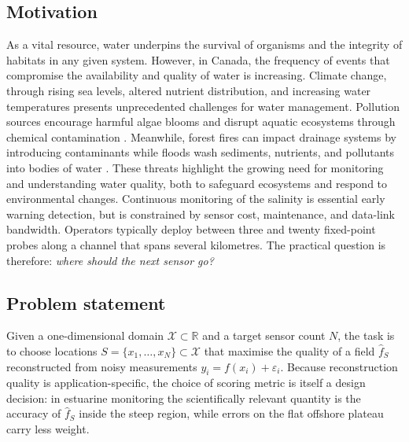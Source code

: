 \documentclass[11pt,letterpaper]{article}
\begin{document}
\subsection{Motivation}
As a vital resource, water underpins the survival of organisms and the integrity of habitats in any given system. However, in Canada, the frequency of events that compromise the availability and quality of water is increasing. Climate change, through rising sea levels, altered nutrient distribution, and increasing water temperatures presents unprecedented challenges for water management. Pollution sources encourage harmful algae blooms and disrupt aquatic ecosystems through chemical contamination \cite{ASRESU2025109194, oneil}. Meanwhile, forest fires can impact drainage systems by introducing contaminants while floods wash sediments, nutrients, and pollutants into bodies of water \cite{bladon}. These threats highlight the growing need for monitoring and understanding water quality, both to safeguard ecosystems and respond to environmental changes. Continuous
monitoring of the salinity is essential
early warning detection, but is constrained by sensor cost, maintenance, and
data-link bandwidth. Operators typically deploy between three and twenty
fixed-point probes along a channel that spans several kilometres. The
practical question is therefore: \emph{where should the next sensor
go?}

\subsection{Problem statement}
Given a one-dimensional domain $\mathcal{X}\subset\mathbb{R}$ and a
target sensor count $N$, the task is to choose locations
$S=\{x_{1},\dots,x_{N}\}\subset\mathcal{X}$ that maximise the quality
of a field $\hat f_{S}$ reconstructed from noisy measurements
$y_{i}=f(x_{i})+\varepsilon_{i}$. Because reconstruction quality is
application-specific, the choice of scoring metric is itself a design
decision: in estuarine monitoring the scientifically relevant quantity
is the accuracy of $\hat f_{S}$ inside the steep region, while
errors on the flat offshore plateau carry less weight.
\end{document}
